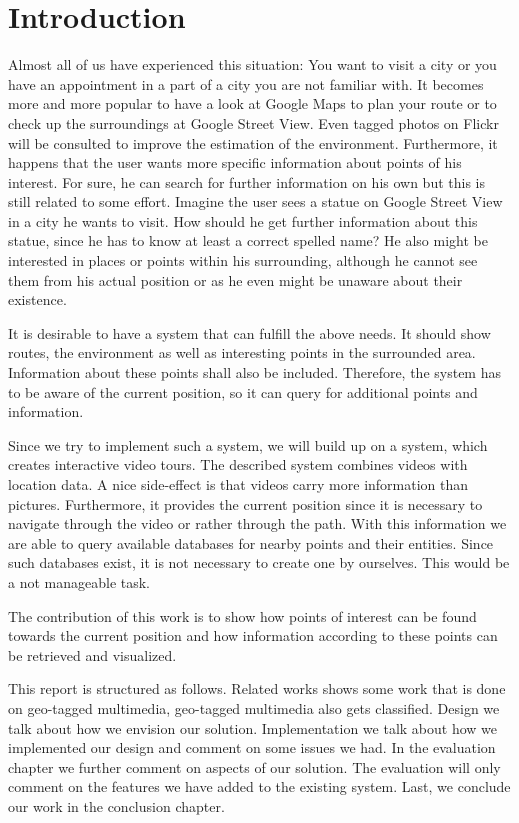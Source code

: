 \documentclass[journal]{IEEEtran}
\begin{document}
\section{Introduction}
Almost all of us have experienced this situation: You want to visit a city or you have an appointment in a part of a city you are not familiar with. It becomes more and more popular to have a look at Google Maps to plan your route or to check up the surroundings at Google Street View. Even tagged photos on Flickr will be consulted to improve the estimation of the environment. Furthermore, it happens that the user wants more specific information about points of his interest. For sure, he can search for further information on his own but this is still related to some effort. Imagine the user sees a statue on Google Street View in a city he wants to visit. How should he get further information about this statue, since he has to know at least a correct spelled name? He also might be interested in places or points within his surrounding, although he cannot see them from his actual position or as he even might be unaware about their existence.

It is desirable to have a system that can fulfill the above needs. It should show routes, the environment as well as interesting points in the surrounded area. Information about these points shall also be included. Therefore, the system has to be aware of the current position, so it can query for additional points and information.

Since we try to implement such a system, we will build up on a system, which creates interactive video tours. The described system combines videos with location data. A nice side-effect is that videos carry more information than pictures. Furthermore, it provides the current position since it is necessary to navigate through the video or rather through the path. With this information we are able to query available databases for nearby points and their entities. Since such databases exist, it is not necessary to create one by ourselves. This would be a not manageable task.

The contribution of this work is to show how points of interest can be found towards the current position and how information according to these points can be retrieved and visualized.

This report is structured as follows. Related works shows some work that is done on geo-tagged multimedia, geo-tagged multimedia also gets classified. Design we talk about how we envision our solution. Implementation we talk about how we implemented our design and comment on some issues we had. In the evaluation chapter we further comment on aspects of our solution. The evaluation will only comment on the features we have added to the existing system. Last, we conclude our work in the conclusion chapter.
\end{document}
